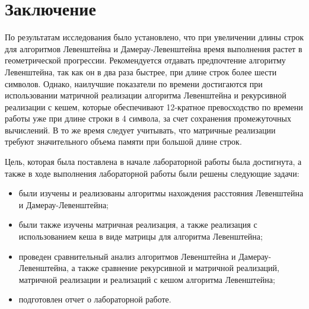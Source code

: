 \chapter*{Заключение}

По результатам исследования было установлено, что при увеличении длины строк для алгоритмов Левенштейна и Дамерау-Левенштейна время выполнения растет в геометрической прогрессии. Рекомендуется отдавать предпочтение алгоритму Левенштейна, так как он в два раза быстрее, при длине строк более шести символов. Однако, наилучшие показатели по времени достигаются при использовании матричной реализации алгоритма Левенштейна и рекурсивной реализации с кешем, которые обеспечивают 12-кратное превосходство по времени работы уже при длине строки в 4 символа, за счет сохранения промежуточных вычислений. В то же время следует учитывать, что матричные реализации требуют значительного объема памяти при большой длине строк.


Цель, которая была поставлена в начале лабораторной работы была достигнута, а также в ходе выполнения лабораторной работы были решены следующие задачи:

\begin{itemize}
	\item были изучены и реализованы алгоритмы нахождения расстояния Левенштейна и Дамерау-Левенштейна;
	\item были также изучены матричная реализация, а также реализация с использованием кеша в виде матрицы для алгоритма Левенштейна;
    \item проведен сравнительный анализ алгоритмов Левенштейна и Дамерау-Левенштейна, а также сравнение рекурсивной и матричной реализаций, матричной реализации и реализаций с кешом алгоритма Левенштейна;
	\item подготовлен отчет о лабораторной работе.
\end{itemize}